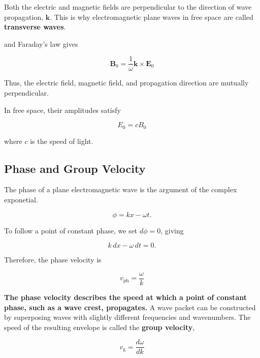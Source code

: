 Both the electric and magnetic fields are perpendicular
to the direction of wave propagation, $\mathbf{k}$.
This is why electromagnetic plane waves in free space
are called \textbf{transverse waves}.


and Faraday's law gives

\begin{equation}
\boxed{
\mathbf{B}_0 =
\frac{1}{\omega}
\mathbf{k}\times\mathbf{E}_0
}
\label{eq:em_e_b_relation}
\end{equation}

Thus, the electric field, magnetic field,
and propagation direction are mutually
perpendicular.

In free space, their amplitudes satisfy

\begin{equation}
\boxed{E_0 = c B_0}
\label{eq:em_field_amplitudes}
\end{equation}

where $c$ is the speed of light.


\subsection{Phase and Group Velocity}

The phase of a plane electromagnetic wave is the argument of the complex exponetial.

\begin{equation}
\boxed{\phi = kx-\omega t}.
\end{equation}

To follow a point of constant phase, we set
$d\phi=0$, giving

\begin{equation}
k\,dx-\omega\,dt=0.
\end{equation}

Therefore, the phase velocity is

\begin{equation}
\boxed{
v_{\mathrm{ph}} =
\frac{\omega}{k}
}
\label{eq:phase_velocity}
\end{equation}

\textbf{The phase velocity describes the speed at
which a point of constant phase, such as a
wave crest, propagates.
}
A wave packet can be constructed by
superposing waves with slightly different
frequencies and wavenumbers. The speed of
the resulting envelope is called the
\textbf{group velocity},

\begin{equation}
\boxed{
v_{\mathrm{g}} =
\frac{d\omega}{dk}
}
\label{eq:group_velocity}
\end{equation}

